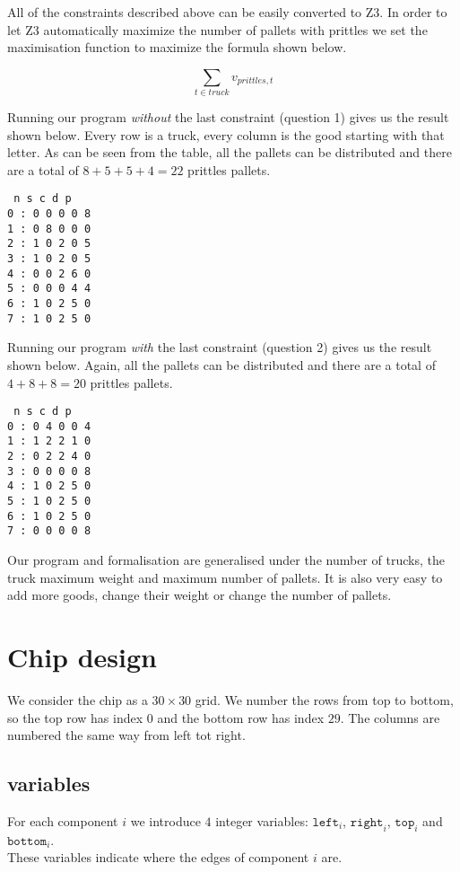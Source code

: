 \documentclass{scrartcl}
\begin{document}
All of the constraints described above can be easily converted to Z3. In order
to let Z3 automatically maximize the number of pallets with prittles we set the
maximisation function to maximize the formula shown below.

\[ \sum_{t \in truck} v_{prittles,t} \]

Running our program \textit{without} the last constraint (question 1) gives us
the result shown below. Every row is a truck, every column is the good starting
with that letter. As can be seen from the table, all the pallets can be
distributed and there are a total of $8 + 5 + 5 + 4 = 22$ prittles pallets.
\begin{verbatim}
 n s c d p
0 : 0 0 0 0 8
1 : 0 8 0 0 0
2 : 1 0 2 0 5
3 : 1 0 2 0 5
4 : 0 0 2 6 0
5 : 0 0 0 4 4
6 : 1 0 2 5 0
7 : 1 0 2 5 0
\end{verbatim}

Running our program \textit{with} the last constraint (question 2) gives us the
result shown below. Again, all the pallets can be distributed and there are a
total of $4 + 8 + 8 = 20$ prittles pallets.

\begin{verbatim}
 n s c d p
0 : 0 4 0 0 4
1 : 1 2 2 1 0
2 : 0 2 2 4 0
3 : 0 0 0 0 8
4 : 1 0 2 5 0
5 : 1 0 2 5 0
6 : 1 0 2 5 0
7 : 0 0 0 0 8
\end{verbatim}

Our program and formalisation are generalised under the number of trucks, the
truck maximum weight and maximum number of pallets. It is also very easy to add
more goods, change their weight or change the number of pallets.

\section{Chip design}

We consider the chip as a $30\times30$ grid. We number the rows from top to bottom, so the top row has index $0$ and the bottom row has index $29$. The columns are numbered the same way from left tot right.

\subsection{variables} %
\label{sub:chip_variables}
	For each component $i$ we introduce $4$ integer variables: $\mathtt{left}_i$, $\mathtt{right}_i$, $\mathtt{top}_i$ and $\mathtt{bottom}_i$.\\
	These variables indicate where the edges of component $i$ are.\\
\end{document}

